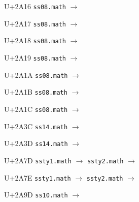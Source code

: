 \documentclass{article}
\begin{document}
\begin{substitutions}
U+2A16  \linebreak
    \texttt{ss08.math} $\to$  

\goodbreak

U+2A17  \linebreak
    \texttt{ss08.math} $\to$  

\goodbreak

U+2A18  \linebreak
    \texttt{ss08.math} $\to$  

\goodbreak

U+2A19  \linebreak
    \texttt{ss08.math} $\to$  

\goodbreak

U+2A1A  \linebreak
    \texttt{ss08.math} $\to$  

\goodbreak

U+2A1B  \linebreak
    \texttt{ss08.math} $\to$  

\goodbreak

U+2A1C  \linebreak
    \texttt{ss08.math} $\to$  

\goodbreak

U+2A3C  \linebreak
    \texttt{ss14.math} $\to$  

\goodbreak

U+2A3D  \linebreak
    \texttt{ss14.math} $\to$  

\goodbreak

U+2A7D  \linebreak
    \texttt{ssty1.math} $\to$  \linebreak
    \texttt{ssty2.math} $\to$  

\goodbreak

U+2A7E  \linebreak
    \texttt{ssty1.math} $\to$  \linebreak
    \texttt{ssty2.math} $\to$  

\goodbreak

U+2A9D  \linebreak
    \texttt{ss10.math} $\to$  


\end{substitutions}
\end{document}
